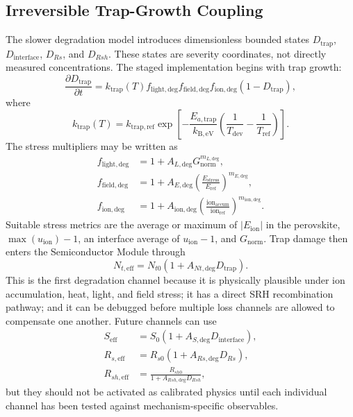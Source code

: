 \subsection{Irreversible Trap-Growth Coupling}

The slower degradation model introduces dimensionless bounded states
$D_{\mathrm{trap}}$, $D_{\mathrm{interface}}$, $D_{Rs}$, and $D_{Rsh}$. These
states are severity coordinates, not directly measured concentrations. The
staged implementation begins with trap growth:
\begin{equation}
\frac{\partial D_{\mathrm{trap}}}{\partial t}
=k_{\mathrm{trap}}(T)
f_{\mathrm{light,deg}}f_{\mathrm{field,deg}}f_{\mathrm{ion,deg}}
\left(1-D_{\mathrm{trap}}\right),
\label{eq:dtrap_stress}
\end{equation}
where
\begin{equation}
k_{\mathrm{trap}}(T)
=k_{\mathrm{trap,ref}}
\exp\left[
-\frac{E_{a,\mathrm{trap}}}{k_{\mathrm{B,eV}}}
\left(\frac{1}{T_{\mathrm{dev}}}-\frac{1}{T_{\mathrm{ref}}}\right)
\right].
\end{equation}
The stress multipliers may be written as
\begin{align}
f_{\mathrm{light,deg}} &=
1+A_{L,\mathrm{deg}}G_{\mathrm{norm}}^{m_{L,\mathrm{deg}}},\\
f_{\mathrm{field,deg}} &=
1+A_{E,\mathrm{deg}}
\left(\frac{E_{\mathrm{stress}}}{E_{\mathrm{ref}}}\right)^{m_{E,\mathrm{deg}}},\\
f_{\mathrm{ion,deg}} &=
1+A_{\mathrm{ion,deg}}
\left(\frac{\mathrm{ion}_{\mathrm{accum}}}{\mathrm{ion}_{\mathrm{ref}}}\right)^{m_{\mathrm{ion,deg}}}.
\end{align}
Suitable stress metrics are the average or maximum of $|E_{\mathrm{ion}}|$ in
the perovskite, $\max(u_{\mathrm{ion}})-1$, an interface average of
$u_{\mathrm{ion}}-1$, and $G_{\mathrm{norm}}$. Trap damage then enters the
Semiconductor Module through
\begin{equation}
N_{t,\mathrm{eff}}=N_{t0}\left(1+A_{Nt,\mathrm{deg}}D_{\mathrm{trap}}\right).
\end{equation}
This is the first degradation channel because it is physically plausible under
ion accumulation, heat, light, and field stress; it has a direct SRH
recombination pathway; and it can be debugged before multiple loss channels
are allowed to compensate one another. Future channels can use
\begin{align}
S_{\mathrm{eff}} &= S_0\left(1+A_{S,\mathrm{deg}}D_{\mathrm{interface}}\right),\\
R_{s,\mathrm{eff}} &= R_{s0}\left(1+A_{Rs,\mathrm{deg}}D_{Rs}\right),\\
R_{sh,\mathrm{eff}} &= \frac{R_{sh0}}{1+A_{Rsh,\mathrm{deg}}D_{Rsh}},
\end{align}
but they should not be activated as calibrated physics until each individual
channel has been tested against mechanism-specific observables.

